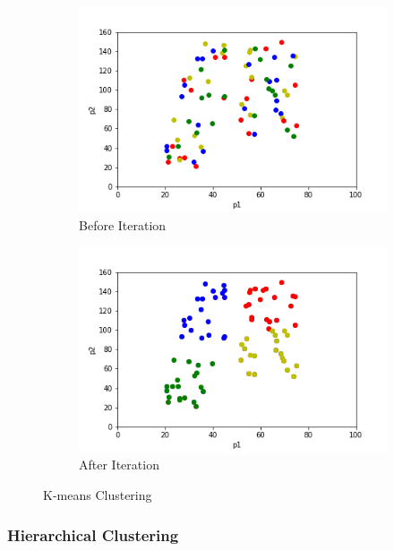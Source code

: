 \documentclass[11pt]{article} %
\theoremstyle{plain}
\theoremstyle{definition}
\newcommand*{\figuretitle}[1]{
  {
    \centering
    \text{#1}
    \par\medskip
  }
}
\begin{document}
\begin{figure}[ht]
  \centering
  \figuretitle{K = 4}
  \begin{subfigure}[b]{0.48\textwidth}
    \includegraphics[width=\linewidth, center]{resources/kmeans_before.png}
    \caption{Before Iteration}
    \label{fig:before_iter}
  \end{subfigure}
  \begin{subfigure}[b]{0.48\textwidth}
    \includegraphics[width=\linewidth, center]{resources/kmeans_after.png}
    \caption{After Iteration}
    \label{fig:after_iter}
  \end{subfigure}
  \caption{K-means Clustering}
  \label{fig:kmeans}
\end{figure}

\subsubsection{Hierarchical Clustering}
\end{document}

